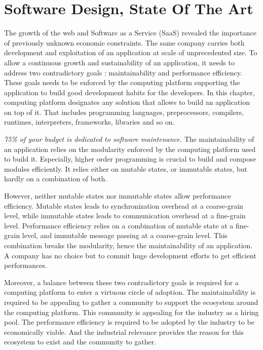 \chapter{Software Design, State Of The Art} \label{chapter3}
\minitoc
\eject


The growth of the web and Software as a Service (SaaS) revealed the importance of previously unknown economic constraints.
The same company carries both development and exploitation of an application at scale of unprecedented size.
To allow a continuous growth and sustainability of an application, it needs to address two contradictory goals : maintainability and performance efficiency.
These goals needs to be enforced by the computing platform supporting the application to build good development habits for the developers.
In this chapter, computing platform designates any solution that allows to build an application on top of it.
That includes programming languages, preprocessors, compilers, runtimes, interpreters, frameworks, libraries and so on.

\textit{75\% of your budget is dedicated to software maintenance.}
The maintainability of an application relies on the modularity enforced by the computing platform used to build it.
Especially, higher order programming is crucial to build and compose modules efficiently.
It relies either on mutable states, or immutable states, but hardly on a combination of both.

However, neither mutable states nor immutable states allow performance efficiency.
Mutable states leads to synchronization overhead at a coarse-grain level, while immutable states leads to communication overhead at a fine-grain level.
Performance efficiency relies on a combination of mutable state at a fine-grain level, and immutable message passing at a coarse-grain level.
This combination breaks the modularity, hence the maintainability of an application.
A company has no choice but to commit huge development efforts to get efficient performances.

Moreover, a balance between these two contradictory goals is required for a computing platform to enter a virtuous circle of adoption.
The maintainability is required to be appealing to gather a community to support the ecosystem around the computing platform.
This community is appealing for the industry as a hiring pool.
The performance efficiency is required to be adopted by the industry to be economically viable.
And the industrial relevance provides the reason for this ecosystem to exist and the community to gather.

